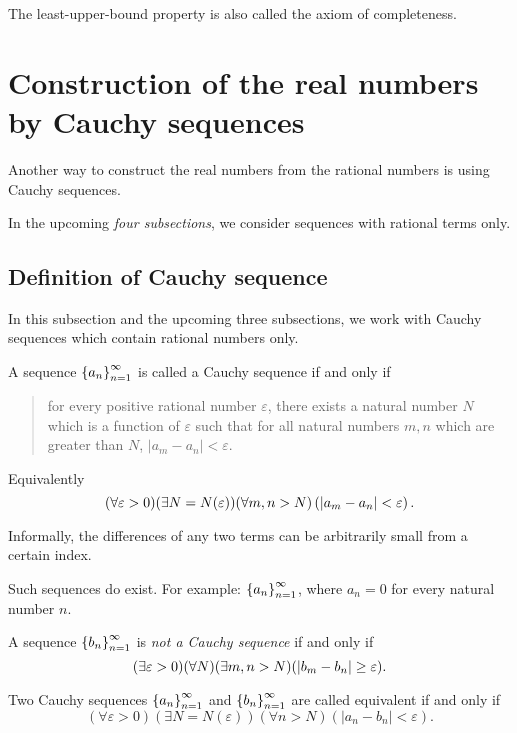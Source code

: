 The least-upper-bound property is also called the axiom of completeness.

\section{Construction of the real numbers by Cauchy sequences}

Another way to construct the real numbers from the rational numbers is using Cauchy sequences.

In the upcoming \textit{four subsections}, we consider sequences with rational terms only.

\subsection{Definition of Cauchy sequence}

In this subsection and the upcoming three subsections, we work with Cauchy sequences which contain rational numbers only.

\begin{definition}
    A sequence ${\left\{{a_{n}}\right\}}^{\infty}_{n=1}$ is called a Cauchy sequence if and only if
    \begin{quotation}
        \noindent for every positive rational number $\varepsilon$, there exists a natural number $N$ which is a function of $\varepsilon$ such that for all natural numbers $m, n$ which are greater than $N$, $\left\vert a_{m} - a_{n}\right\vert < \varepsilon$.
    \end{quotation}

    Equivalently
    \[
        (\forall\varepsilon > 0)(\exists N=N(\varepsilon))(\forall m, n > N)\left(\left\vert{a_{m} - a_{n}}\right\vert < \varepsilon\right).
    \]
\end{definition}

Informally, the differences of any two terms can be arbitrarily small from a certain index.

Such sequences do exist. For example: ${\left\{{a_{n}}\right\}}^{\infty}_{n=1}$, where $a_{n} = 0$ for every natural number $n$.

A sequence ${\left\{{b_{n}}\right\}}^{\infty}_{n=1}$ is \textit{not a Cauchy sequence} if and only if
\[
    (\exists\varepsilon > 0)(\forall N)(\exists m, n > N)(\left\vert{b_{m} - b_{n}}\right\vert\ge\varepsilon).
\]

\begin{definition}
    Two Cauchy sequences ${\left\{{a_{n}}\right\}}^{\infty}_{n=1}$ and ${\left\{{b_{n}}\right\}}^{\infty}_{n=1}$ are called equivalent if and only if
    \[
        (\forall\varepsilon > 0)(\exists N=N(\varepsilon))(\forall n > N)(\left\vert a_{n} - b_{n} \right\vert < \varepsilon).
    \]
\end{definition}

